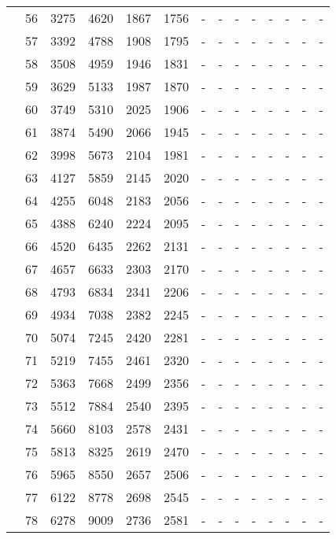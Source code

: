 \begin{table}[htb]
{\begin{tabular}{|c|c|c|c|c|c|c|c|c|c|c|c|c|c|}
 & 
56 & 3275 & 4620 & 1867 & 1756
 & - & -
 & - & -
 & - & -
 & - & -
 \\
 & 
57 & 3392 & 4788 & 1908 & 1795
 & - & -
 & - & -
 & - & -
 & - & -
 \\
 & 
58 & 3508 & 4959 & 1946 & 1831
 & - & -
 & - & -
 & - & -
 & - & -
 \\
 & 
59 & 3629 & 5133 & 1987 & 1870
 & - & -
 & - & -
 & - & -
 & - & -
 \\
 & 
60 & 3749 & 5310 & 2025 & 1906
 & - & -
 & - & -
 & - & -
 & - & -
 \\
 & 
61 & 3874 & 5490 & 2066 & 1945
 & - & -
 & - & -
 & - & -
 & - & -
 \\
 & 
62 & 3998 & 5673 & 2104 & 1981
 & - & -
 & - & -
 & - & -
 & - & -
 \\
 & 
63 & 4127 & 5859 & 2145 & 2020
 & - & -
 & - & -
 & - & -
 & - & -
 \\
 & 
64 & 4255 & 6048 & 2183 & 2056
 & - & -
 & - & -
 & - & -
 & - & -
 \\
 & 
65 & 4388 & 6240 & 2224 & 2095
 & - & -
 & - & -
 & - & -
 & - & -
 \\
 & 
66 & 4520 & 6435 & 2262 & 2131
 & - & -
 & - & -
 & - & -
 & - & -
 \\
 & 
67 & 4657 & 6633 & 2303 & 2170
 & - & -
 & - & -
 & - & -
 & - & -
 \\
 & 
68 & 4793 & 6834 & 2341 & 2206
 & - & -
 & - & -
 & - & -
 & - & -
 \\
 & 
69 & 4934 & 7038 & 2382 & 2245
 & - & -
 & - & -
 & - & -
 & - & -
 \\
 & 
70 & 5074 & 7245 & 2420 & 2281
 & - & -
 & - & -
 & - & -
 & - & -
 \\
 & 
71 & 5219 & 7455 & 2461 & 2320
 & - & -
 & - & -
 & - & -
 & - & -
 \\
 & 
72 & 5363 & 7668 & 2499 & 2356
 & - & -
 & - & -
 & - & -
 & - & -
 \\
 & 
73 & 5512 & 7884 & 2540 & 2395
 & - & -
 & - & -
 & - & -
 & - & -
 \\
 & 
74 & 5660 & 8103 & 2578 & 2431
 & - & -
 & - & -
 & - & -
 & - & -
 \\
 & 
75 & 5813 & 8325 & 2619 & 2470
 & - & -
 & - & -
 & - & -
 & - & -
 \\
 & 
76 & 5965 & 8550 & 2657 & 2506
 & - & -
 & - & -
 & - & -
 & - & -
 \\
 & 
77 & 6122 & 8778 & 2698 & 2545
 & - & -
 & - & -
 & - & -
 & - & -
 \\
 & 
78 & 6278 & 9009 & 2736 & 2581
 & - & -
 & - & -
 & - & -
 & - & -

\end{tabular}}
\end{table}
